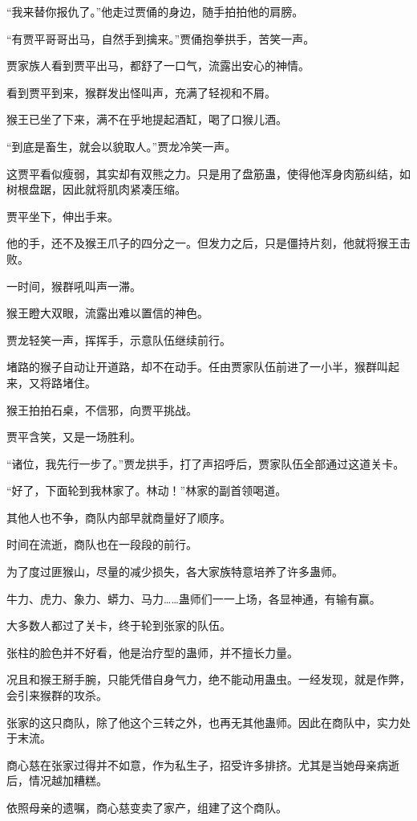 \begin{this_body}
“我来替你报仇了。”他走过贾俑的身边，随手拍拍他的肩膀。

“有贾平哥哥出马，自然手到擒来。”贾俑抱拳拱手，苦笑一声。

贾家族人看到贾平出马，都舒了一口气，流露出安心的神情。

看到贾平到来，猴群发出怪叫声，充满了轻视和不屑。

猴王已坐了下来，满不在乎地提起酒缸，喝了口猴儿酒。

“到底是畜生，就会以貌取人。”贾龙冷笑一声。

这贾平看似瘦弱，其实却有双熊之力。只是用了盘筋蛊，使得他浑身肉筋纠结，如树根盘踞，因此就将肌肉紧凑压缩。

贾平坐下，伸出手来。

他的手，还不及猴王爪子的四分之一。但发力之后，只是僵持片刻，他就将猴王击败。

一时间，猴群吼叫声一滞。

猴王瞪大双眼，流露出难以置信的神色。

贾龙轻笑一声，挥挥手，示意队伍继续前行。

堵路的猴子自动让开道路，却不在动手。任由贾家队伍前进了一小半，猴群叫起来，又将路堵住。

猴王拍拍石桌，不信邪，向贾平挑战。

贾平含笑，又是一场胜利。

“诸位，我先行一步了。”贾龙拱手，打了声招呼后，贾家队伍全部通过这道关卡。

“好了，下面轮到我林家了。林动！”林家的副首领喝道。

其他人也不争，商队内部早就商量好了顺序。

时间在流逝，商队也在一段段的前行。

为了度过匪猴山，尽量的减少损失，各大家族特意培养了许多蛊师。

牛力、虎力、象力、蟒力、马力……蛊师们一一上场，各显神通，有输有赢。

大多数人都过了关卡，终于轮到张家的队伍。

张柱的脸色并不好看，他是治疗型的蛊师，并不擅长力量。

况且和猴王掰手腕，只能凭借自身气力，绝不能动用蛊虫。一经发现，就是作弊，会引来猴群的攻杀。

张家的这只商队，除了他这个三转之外，也再无其他蛊师。因此在商队中，实力处于末流。

商心慈在张家过得并不如意，作为私生子，招受许多排挤。尤其是当她母亲病逝后，情况越加糟糕。

依照母亲的遗嘱，商心慈变卖了家产，组建了这个商队。


\end{this_body}
